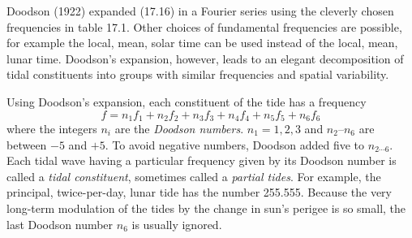Doodson (1922) expanded (17.16) in a Fourier series using the cleverly
chosen frequencies in table 17.1. Other choices of fundamental
frequencies are possible, for example the local, mean, solar time can be used
instead of the local, mean, lunar time. Doodson's expansion, however, leads to an
elegant decomposition of tidal constituents into groups with similar frequencies and
spatial variability.

Using Doodson's expansion, each constituent of the tide has a frequency
\begin{equation}
f = n_1 f_1 + n_2 f_2 + n_3 f_3 + n_4 f_4 + n_5 f_5 + n_6 f_6
\end{equation}
where the integers $n_i$ are the \textit{Doodson numbers}. $n_1 = 1, 2, 3 $ and $n_2$--$n_6$ are between
$-5$ and $+5$. To avoid negative numbers, Doodson added five to $n_{2 \cdots 6}$. Each
tidal wave having a particular frequency given by its Doodson number is called a \textit{tidal
constituent}, sometimes called a \textit{partial
tides}. For example, the principal,
twice-per-day, lunar tide has the number 255.555. Because the very long-term modulation of the
tides by the change in sun's perigee is so small, the last Doodson number
$n_6$ is usually ignored.

